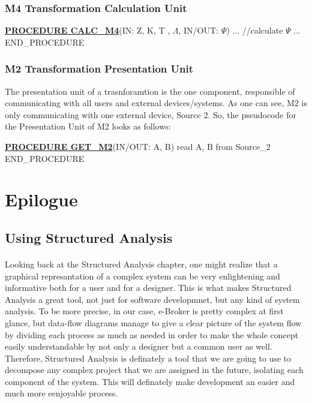 \documentclass{article}
\begin{document}
\subsubsection{M4 Transformation Calculation Unit}
\begin{algorithmic}[H]
\STATE \underline{\textbf{PROCEDURE CALC\_M4}}(IN: Z, K, T , $\Lambda$, IN/OUT: $\Psi$)
	\STATE ...
	\STATE //calculate $\Psi$
	\STATE ...
\STATE END\_PROCEDURE
\end{algorithmic}

\subsubsection{M2 Transformation Presentation Unit}
The presentation unit of a trasnforamtion is the one component, responsible of communicating with all users
and external devices/systems. As one can see, M2 is only communicating with one external device, Source 2.
So, the pseudocode for the Presentation Unit of M2 looks as follows:
\begin{algorithmic}[H]
\STATE \underline{\textbf{PROCEDURE GET\_M2}}(IN/OUT: A, B)
	\STATE read A, B from Source\_2
\STATE END\_PROCEDURE
\end{algorithmic}

\newpage
\section{Epilogue}

\subsection{Using Structured Analysis}  
\paragraph{}
Looking back at the Structured Analysis chapter, one might realize that
a graphical represantation of a complex system can be very enlightening and informative both for
a user and for a designer. This is what makes Structured Analysis a great tool, not just for software developmnet, but any
kind of system analysis. To be more precise, in our case, e-Broker is pretty complex at first glance,
but data-flow diagrams manage
to give a clear picture of the system flow by dividing each process as much as needed in order to make the whole concept
easily understandable by not only a designer but a common user as well. Therefore, Structured Analysis is definately a tool
that we are going to use to decompose any complex project that we are assigned in the future, isolating each component of
the system. This will definately make development an easier and much more eenjoyable process. 
\end{document}
